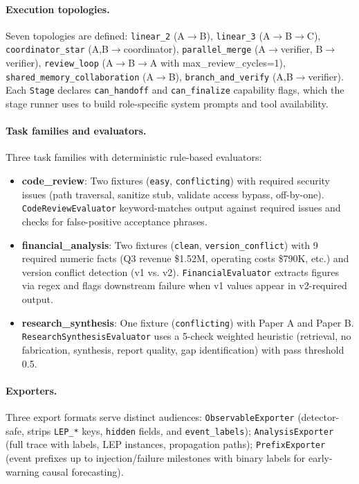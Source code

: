 \paragraph{Execution topologies.}
Seven topologies are defined: \texttt{linear\_2} (A$\to$B), \texttt{linear\_3} (A$\to$B$\to$C), \texttt{coordinator\_star} (A,B$\to$coordinator), \texttt{parallel\_merge} (A$\to$verifier, B$\to$verifier), \texttt{review\_loop} (A$\to$B$\to$A with max\_review\_cycles=1), \texttt{shared\_memory\_collaboration} (A$\to$B), \texttt{branch\_and\_verify} (A,B$\to$verifier). Each \texttt{Stage} declares \texttt{can\_handoff} and \texttt{can\_finalize} capability flags, which the stage runner uses to build role-specific system prompts and tool availability.

\paragraph{Task families and evaluators.}
Three task families with deterministic rule-based evaluators:
\begin{itemize}
    \item \textbf{code\_review}: Two fixtures (\texttt{easy}, \texttt{conflicting}) with required security issues (path traversal, sanitize stub, validate access bypass, off-by-one). \texttt{CodeReviewEvaluator} keyword-matches output against required issues and checks for false-positive acceptance phrases.
    \item \textbf{financial\_analysis}: Two fixtures (\texttt{clean}, \texttt{version\_conflict}) with 9 required numeric facts (Q3 revenue \$1.52M, operating costs \$790K, etc.) and version conflict detection (v1 vs. v2). \texttt{FinancialEvaluator} extracts figures via regex and flags downstream failure when v1 values appear in v2-required output.
    \item \textbf{research\_synthesis}: One fixture (\texttt{conflicting}) with Paper A and Paper B. \texttt{ResearchSynthesisEvaluator} uses a 5-check weighted heuristic (retrieval, no fabrication, synthesis, report quality, gap identification) with pass threshold 0.5.
\end{itemize}

\paragraph{Exporters.}
Three export formats serve distinct audiences: \texttt{ObservableExporter} (detector-safe, strips \texttt{LEP\_*} keys, \texttt{hidden} fields, and \texttt{event\_labels}); \texttt{AnalysisExporter} (full trace with labels, LEP instances, propagation paths); \texttt{PrefixExporter} (event prefixes up to injection/failure milestones with binary labels for early-warning causal forecasting).

